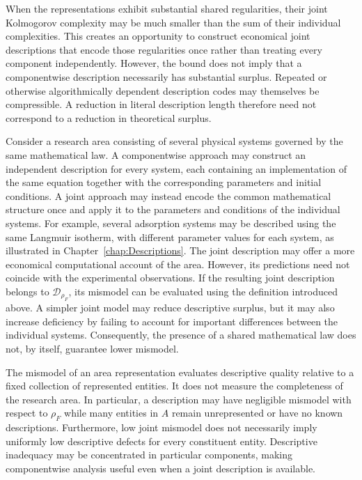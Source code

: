 When the representations exhibit substantial shared regularities, their joint Kolmogorov complexity may be much smaller than the sum of their individual complexities. This creates an opportunity to construct economical joint descriptions that encode those regularities once rather than treating every component independently. However, the bound does not imply that a componentwise description necessarily has substantial surplus. Repeated or otherwise algorithmically dependent description codes may themselves be compressible. A reduction in literal description length therefore need not correspond to a reduction in theoretical surplus.

\begin{example}
Consider a research area consisting of several physical systems governed by the same mathematical law. A componentwise approach may construct an independent description for every system, each containing an implementation of the same equation together with the corresponding parameters and initial conditions. A joint approach may instead encode the common mathematical structure once and apply it to the parameters and conditions of the individual systems. For example, several adsorption systems may be described using the same Langmuir isotherm, with different parameter values for each system, as illustrated in Chapter~\ref{chap:Descriptions}. The joint description may offer a more economical computational account of the area. However, its predictions need not coincide with the experimental observations. If the resulting joint description belongs to $\mathcal D_{\rho_F}$, its mismodel can be evaluated using the definition introduced above. A simpler joint model may reduce descriptive surplus, but it may also increase deficiency by failing to
account for important differences between the individual systems. Consequently, the presence of a shared mathematical law does not, by itself, guarantee lower mismodel.
\end{example}

The mismodel of an area representation evaluates descriptive quality relative to a fixed collection of represented entities. It does not measure the completeness of the research area. In particular, a description may have negligible mismodel with respect to $\rho_F$ while many entities in $A$ remain unrepresented or have no known descriptions. Furthermore, low joint mismodel does not necessarily imply uniformly low descriptive defects for every constituent entity. Descriptive inadequacy may be concentrated in particular components, making componentwise analysis useful even when a joint description is available.

